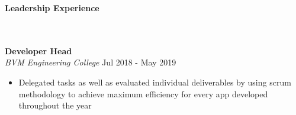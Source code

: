 \documentclass[]{article}
\newcommand{\lineunder} {
    \vspace*{-8pt} \\
    \hrulefill \\
}
\newcommand{\header} [1] {
    {\vspace*{6pt} \fontsize{12}{12}\selectfont \textbf{#1}}
     \lineunder
}
\begin{document}

\vspace{-3mm}
\header{Leadership Experience}
\hspace{1mm}
\textbf{Developer Head}\\ 
\hspace{1mm}
\textit{BVM Engineering College} \hfill Jul 2018 - May 2019\\
\vspace{-3mm}
\begin{itemize}
	\setlength\itemsep{-1mm}
		\item Delegated tasks as well as evaluated individual deliverables by using scrum methodology to achieve maximum efficiency for every app developed throughout the year
\end{itemize}

\ 
\end{document}
